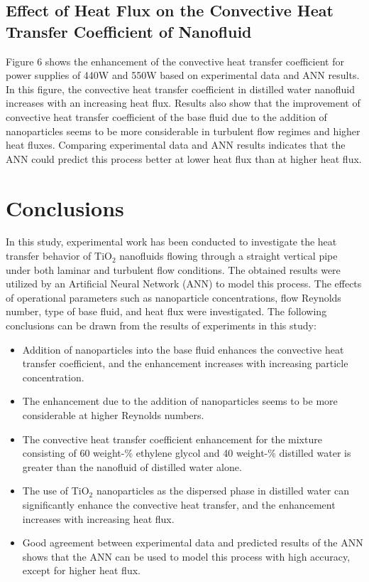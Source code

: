 \documentclass{article}
\begin{document}
\subsection{Effect of Heat Flux on the Convective Heat Transfer Coefficient of Nanofluid}

Figure 6 shows the enhancement of the convective heat transfer coefficient for power supplies of 440W and 550W based on experimental data and ANN results. In this figure, the convective heat transfer coefficient in distilled water nanofluid increases with an increasing heat flux. Results also show that the improvement of convective heat transfer coefficient of the base fluid due to the addition of nanoparticles seems to be more considerable in turbulent flow regimes and higher heat fluxes. Comparing experimental data and ANN results indicates that the ANN could predict this process better at lower heat flux than at higher heat flux.

\section{Conclusions}

In this study, experimental work has been conducted to investigate the heat transfer behavior of TiO$_2$ nanofluids flowing through a straight vertical pipe under both laminar and turbulent flow conditions. The obtained results were utilized by an Artificial Neural Network (ANN) to model this process. The effects of operational parameters such as nanoparticle concentrations, flow Reynolds number, type of base fluid, and heat flux were investigated. The following conclusions can be drawn from the results of experiments in this study:

\begin{itemize}
	\item Addition of nanoparticles into the base fluid enhances the convective heat transfer coefficient, and the enhancement increases with increasing particle concentration.
	\item The enhancement due to the addition of nanoparticles seems to be more considerable at higher Reynolds numbers.
	\item The convective heat transfer coefficient enhancement for the mixture consisting of 60 weight-\% ethylene glycol and 40 weight-\% distilled water is greater than the nanofluid of distilled water alone.
	\item The use of TiO$_2$ nanoparticles as the dispersed phase in distilled water can significantly enhance the convective heat transfer, and the enhancement increases with increasing heat flux.
	\item Good agreement between experimental data and predicted results of the ANN shows that the ANN can be used to model this process with high accuracy, except for higher heat flux.
\end{itemize}
\end{document}
